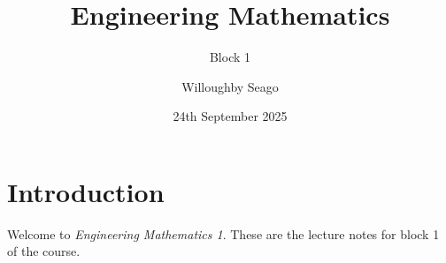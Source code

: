 \documentclass[fleqn]{LectureClass/LectureClass}
\title{Engineering Mathematics}
\author{Willoughby Seago}
\date{24th September 2025}
\subtitle{Block 1}
\begin{document}
    \frontmatter
    \titlepage
    \innertitlepage{}
    \tableofcontents
    \mainmatter
    
    \chapter{Introduction}
    Welcome to \textit{Engineering Mathematics 1}.
    These are the lecture notes for block 1 of the course.
    
\end{document}
